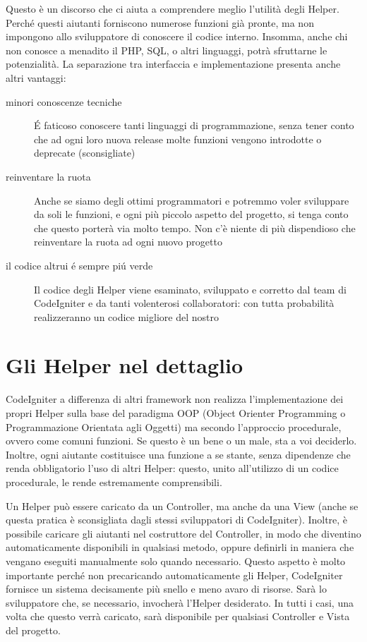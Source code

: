Questo è un discorso che ci aiuta a comprendere meglio l'utilità degli Helper. Perché questi aiutanti forniscono numerose funzioni già pronte, ma non impongono allo sviluppatore di conoscere il codice interno. Insomma, anche chi non conosce a menadito il \ac{PHP}, \ac{SQL}, o altri linguaggi, potrà sfruttarne le potenzialità. La separazione tra interfaccia e implementazione presenta anche altri vantaggi:

\begin{description}
\item[minori conoscenze tecniche] \'E faticoso conoscere tanti linguaggi di programmazione, senza tener conto che ad ogni loro nuova release molte funzioni vengono introdotte o deprecate (sconsigliate)
\item[reinventare la ruota] Anche se siamo degli ottimi programmatori e potremmo voler sviluppare da soli le funzioni, e ogni più piccolo aspetto del progetto, si tenga conto che questo porterà via molto tempo. Non c'è niente di più dispendioso che reinventare la ruota ad ogni nuovo progetto
\item[il codice altrui \'e sempre pi\'u verde] Il codice degli Helper viene esaminato, sviluppato e corretto dal team di CodeIgniter e da tanti volenterosi collaboratori: con tutta probabilità realizzeranno un codice migliore del nostro
\end{description}

\section{Gli Helper nel dettaglio}
CodeIgniter a differenza di altri framework non realizza l'implementazione dei propri Helper sulla base del paradigma OOP (Object Orienter Programming o Programmazione Orientata agli Oggetti) ma secondo l'approccio procedurale, ovvero come comuni funzioni. Se questo è un bene o un male, sta a voi deciderlo. Inoltre, ogni aiutante costituisce una funzione a se stante, senza dipendenze che renda obbligatorio l'uso di altri Helper: questo, unito all'utilizzo di un codice procedurale, le rende estremamente comprensibili.

Un Helper può essere caricato da un Controller, ma anche da una View (anche se questa pratica è sconsigliata dagli stessi sviluppatori di CodeIgniter). Inoltre, è possibile caricare gli aiutanti nel costruttore del Controller, in modo che diventino automaticamente disponibili in qualsiasi metodo, oppure definirli in maniera che vengano eseguiti manualmente solo quando necessario. Questo aspetto è molto importante perché non precaricando automaticamente gli Helper, CodeIgniter fornisce un sistema decisamente più snello e meno avaro di risorse. Sarà lo sviluppatore che, se necessario, invocherà l'Helper desiderato. In tutti i casi, una volta che questo verrà caricato, sarà disponibile per qualsiasi Controller e Vista del progetto.

